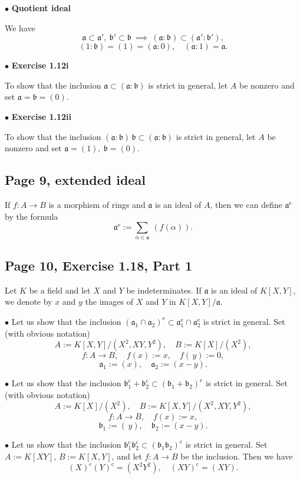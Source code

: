 \documentclass[parskip=half,fontsize=12pt]{scrartcl}%
\newcommand{\oo}{\operatorname}\newcommand{\ooo}{\operatorname*}
\newcommand{\mf}{\mathfrak}
\newcommand{\bbb}{\mf b}
\newcommand{\bu}{\bullet}
\begin{document}
$\bu$ \textbf{Quotient ideal}%

We have 
$$
\mf a\subset\mf a',\ \bbb'\subset\bbb\ \implies\ (\mf a:\bbb)\subset(\mf a':\bbb'),
$$ 
$$
(1:\bbb)=(1)=(\mf a:0),\quad(\mf a:1)=\mf a.
$$

$\bu$ \textbf{Exercise 1.12i}%

To show that the inclusion $\mf a\subset(\mf a:\bbb)$ is strict in general, let $A$ be nonzero and set $\mf a=\bbb=(0)$.

$\bu$ \textbf{Exercise 1.12ii}%

To show that the inclusion $(\mf a\!:\!\bbb)\,\bbb\subset(\mf a:\bbb)$ is strict in general, let $A$ be nonzero and set $\mf a=(1),\ \bbb=(0)$.

\subsection{Page 9, extended ideal}%

If $f:A\to B$ is a morphism of rings and $\mf a$ is an ideal of $A$, then we can define $\mf a^{\oo e}$ by the formula
$$
\mf a^{\oo e}:=\sum_{\alpha\in\mf a}\ (f(\alpha)).
$$

\subsection{Page 10, Exercise 1.18, Part 1}%

Let $K$ be a field and let $X$ and $Y$ be indeterminates. If $\mf a$ is an ideal of $K[X,Y]$, we denote by $x$ and $y$ the images of $X$ and $Y$ in $K[X,Y]/\mf a$.

$\bu$ Let us show that the inclusion $(\mf a_1\cap\mf a_2)^{\oo e}\subset\mf a_1^{\oo e}\cap\mf a_2^{\oo e}$ is strict in general. Set (with obvious notation) 
$$
A:=K[X,Y]/(X^2,XY,Y^2),\quad B:=K[X]/(X^2),
$$ 
$$
f:A\to B,\quad f(x):=x,\quad f(\,y):=0,
$$ 
$$
\mf a_1:=(x),\quad\mf a_2:=(x-y).
$$

$\bu$ Let us show that the inclusion $\bbb_1^{\oo c}+\bbb_2^{\oo c}\subset(\bbb_1+\bbb_2)^{\oo c}$ is strict in general. Set (with obvious notation) 
$$
A:=K[X]/(X^2),\quad B:=K[X,Y]/(X^2,XY,Y^2),
$$ 
$$
f:A\to B,\quad f(x):=x,
$$ 
$$
\bbb_1:=(\,y),\quad\bbb_2:=(x-y).
$$

$\bu$ Let us show that the inclusion $\bbb_1^{\oo c}\bbb_2^{\oo c}\subset(\bbb_1\bbb_2)^{\oo c}$ is strict in general. Set $A:=K[XY]$, $B:=K[X,Y]$, and let $f:A\to B$ be the inclusion. Then we have 
$$
(X)^{\oo c}(Y)^{\oo c}=(X^2Y^2),\quad(XY)^{\oo c}=(XY).
$$
\end{document}

